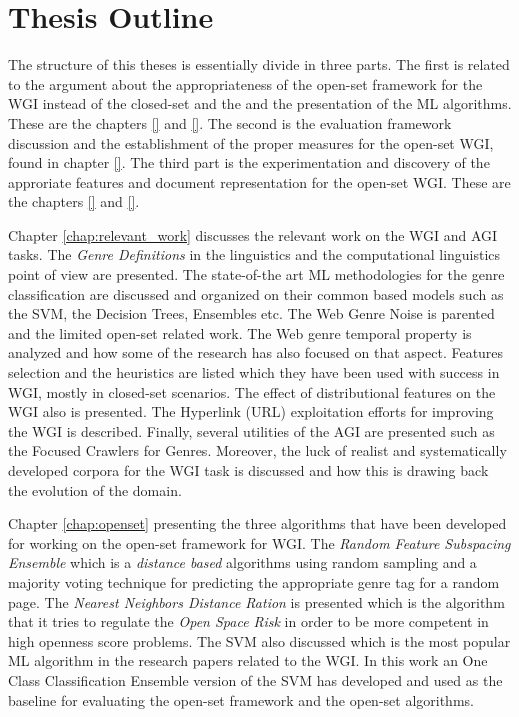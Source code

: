 \section{Thesis Outline} \label{chap:Introduction:sec:thesis_outline}

The structure of this theses is essentially divide in three parts. The first is related to the argument about the appropriateness of the open-set framework for the WGI instead of the closed-set and the and the presentation of the ML algorithms. These are the chapters \ref{} and \ref{}. The second is the evaluation framework discussion and the establishment of the proper measures for the open-set WGI, found in chapter \ref{}. The third part is the experimentation and discovery of the approriate features and document representation for the open-set WGI. These are the chapters \ref{} and \ref{}.

Chapter \ref{chap:relevant_work} discusses the relevant work on the WGI and AGI tasks. The \textit{Genre Definitions} in the linguistics and the computational linguistics point of view are presented. The state-of-the art ML methodologies for the genre classification are discussed and organized on their common based models such as the SVM, the Decision Trees, Ensembles etc. The Web Genre Noise is parented and the limited open-set related work. The Web genre temporal property is analyzed and how some of the research has also focused on that aspect. Features selection and  the heuristics are listed which they have been used with success in WGI, mostly in closed-set scenarios. The effect of distributional features on the WGI also is presented. The Hyperlink (URL) exploitation efforts for improving the WGI is described. Finally, several utilities of the AGI are presented such as the Focused Crawlers for Genres. Moreover, the luck of realist and systematically developed corpora for the WGI task is discussed and how this is drawing back the evolution of the domain. 

Chapter \ref{chap:openset} presenting the three algorithms that have been developed for working on the open-set framework for WGI. The \textit{Random Feature Subspacing Ensemble} which is a \textit{distance based} algorithms using random sampling and a majority voting technique for predicting the appropriate genre tag for a random page. The \textit{Nearest Neighbors Distance Ration} is presented which is the algorithm that it tries to regulate the \textit{Open Space Risk} in order to be more competent in high openness score problems. The SVM also discussed which is the most popular ML algorithm in the research papers related to the WGI. In this work an One Class Classification Ensemble version of the SVM has developed and used as the baseline for evaluating the open-set framework and the open-set algorithms. 

